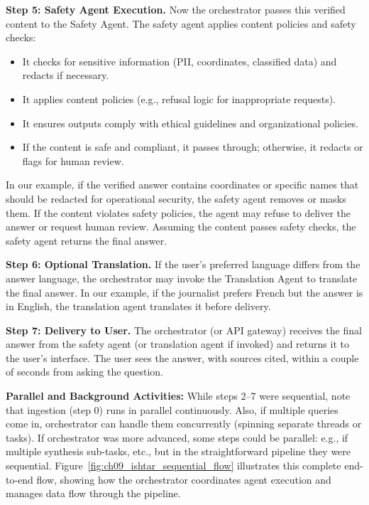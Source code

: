 \textbf{Step 5: Safety Agent Execution.} Now the orchestrator passes this verified content to the Safety Agent. The safety agent applies content policies and safety checks:
\begin{itemize}
    \item It checks for sensitive information (PII, coordinates, classified data) and redacts if necessary.
    \item It applies content policies (e.g., refusal logic for inappropriate requests).
    \item It ensures outputs comply with ethical guidelines and organizational policies.
    \item If the content is safe and compliant, it passes through; otherwise, it redacts or flags for human review.
\end{itemize}
In our example, if the verified answer contains coordinates or specific names that should be redacted for operational security, the safety agent removes or masks them. If the content violates safety policies, the agent may refuse to deliver the answer or request human review. Assuming the content passes safety checks, the safety agent returns the final answer.

\textbf{Step 6: Optional Translation.} If the user's preferred language differs from the answer language, the orchestrator may invoke the Translation Agent to translate the final answer. In our example, if the journalist prefers French but the answer is in English, the translation agent translates it before delivery.

\textbf{Step 7: Delivery to User.} The orchestrator (or API gateway) receives the final answer from the safety agent (or translation agent if invoked) and returns it to the user's interface. The user sees the answer, with sources cited, within a couple of seconds from asking the question.

\textbf{Parallel and Background Activities:} While steps 2–7 were sequential, note that ingestion (step 0) runs in parallel continuously. Also, if multiple queries come in, orchestrator can handle them concurrently (spinning separate threads or tasks). If orchestrator was more advanced, some steps could be parallel: e.g., if multiple synthesis sub-tasks, etc., but in the straightforward pipeline they were sequential. Figure~\ref{fig:ch09_ishtar_sequential_flow} illustrates this complete end-to-end flow, showing how the orchestrator coordinates agent execution and manages data flow through the pipeline.

